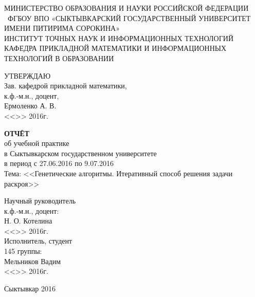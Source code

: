 \documentclass[14pt]{extarticle}
\begin{document}
\thispagestyle{empty}
	\begin{center}
		\small
		МИНИСТЕРСТВО ОБРАЗОВАНИЯ И НАУКИ РОССИЙСКОЙ ФЕДЕРАЦИИ\\~ФГБОУ ВПО «СЫКТЫВКАРСКИЙ ГОСУДАРСТВЕННЫЙ УНИВЕРСИТЕТ ИМЕНИ ПИТИРИМА СОРОКИНА»\\
		ИНСТИТУТ ТОЧНЫХ НАУК И ИНФОРМАЦИОННЫХ ТЕХНОЛОГИЙ\\
		КАФЕДРА ПРИКЛАДНОЙ МАТЕМАТИКИ И ИНФОРМАЦИОННЫХ ТЕХНОЛОГИЙ В ОБРАЗОВАНИИ\\
	\end{center}
	\vspace{0.5cm}
	\begin{flushright}
		УТВЕРЖДАЮ\\
		Зав. кафедрой прикладной математики,\\
		к.ф.-м.н., доцент,\\
		\underline{\phantom{aaaaaaaaaaaa}}Ермоленко А. В.\\
		<<\underline{\phantom{aaaa}}>>\underline{\phantom{aaaaaaaaaaaa}} 2016г.\\
	\end{flushright}
	\begin{center}		
		\vspace{2.5cm}
		\large \textbf{ОТЧЁТ}\\
		\small об учебной практике\\
		в Сыктывкарском государственном университете\\
		в период с 27.06.2016 по 9.07.2016\\
		Тема: <<Генетические алгоритмы. Итеративный способ решения задачи раскроя>>
	\end{center}
\begin{flushright}
	\small Научный руководитель\\к.ф.-м.н., доцент:\\\underline{\phantom{aaaaaaaaaaa}}Н. О. Котелина\\
	<<\underline{\phantom{aaaa}}>>\underline{\phantom{aaaaaaaaaaa}} 2016г.\\
	\vspace{0.5cm}
	Исполнитель, студент\\145 группы:\\\underline{\phantom{aaaaaaaaaaa}}Мельников Вадим\\<<\underline{\phantom{aaaa}}>>\underline{\phantom{aaaaaaaaaaa}} 2016г.\\
\end{flushright}
\vspace{3cm}
\begin{center}
	Сыктывкар 2016
\end{center}
\newpage
	\tableofcontents
	\thispagestyle{empty}
	\newpage
\end{document}
